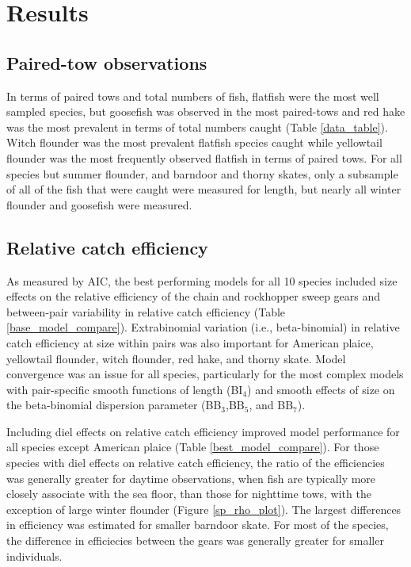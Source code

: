 \documentclass[
  12pt,
]{article}
\begin{document}
\hypertarget{results}{%
\section{Results}\label{results}}

\hypertarget{paired-tow-observations}{%
\subsection{Paired-tow observations}\label{paired-tow-observations}}

In terms of paired tows and total numbers of fish, flatfish were the
most well sampled species, but goosefish was observed in the most
paired-tows and red hake was the most prevalent in terms of total
numbers caught (Table \ref{data_table}). Witch flounder was the most
prevalent flatfish species caught while yellowtail flounder was the most
frequently observed flatfish in terms of paired tows. For all species
but summer flounder, and barndoor and thorny skates, only a subsample of
all of the fish that were caught were measured for length, but nearly
all winter flounder and goosefish were measured.

\hypertarget{relative-catch-efficiency}{%
\subsection{Relative catch efficiency}\label{relative-catch-efficiency}}

As measured by AIC, the best performing models for all 10 species
included size effects on the relative efficiency of the chain and
rockhopper sweep gears and between-pair variability in relative catch
efficiency (Table \ref{base_model_compare}). Extrabinomial variation
(i.e., beta-binomial) in relative catch efficiency at size within pairs
was also important for American plaice, yellowtail flounder, witch
flounder, red hake, and thorny skate. Model convergence was an issue for
all species, particularly for the most complex models with pair-specific
smooth functions of length (BI\(_4\)) and smooth effects of size on the
beta-binomial dispersion parameter (BB\(_3\),BB\(_5\), and BB\(_7\)).

Including diel effects on relative catch efficiency improved model
performance for all species except American plaice (Table
\ref{best_model_compare}). For those species with diel effects on
relative catch efficiency, the ratio of the efficiencies was generally
greater for daytime observations, when fish are typically more closely
associate with the sea floor, than those for nighttime tows, with the
exception of large winter flounder (Figure \ref{sp_rho_plot}). The
largest differences in efficiency was estimated for smaller barndoor
skate. For most of the species, the difference in efficiecies between
the gears was generally greater for smaller individuals.
\end{document}

